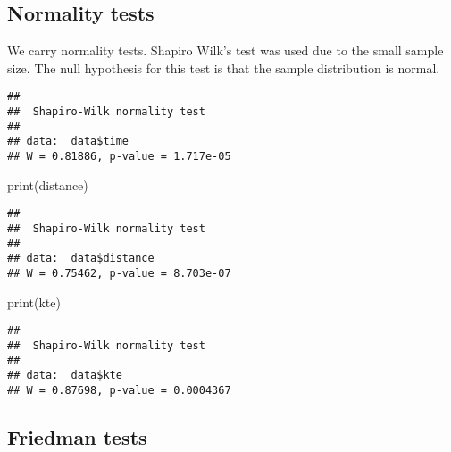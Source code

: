 \documentclass[
]{article}
\newenvironment{Shaded}{\begin{snugshade}}{\end{snugshade}}
\newcommand{\FunctionTok}[1]{\textcolor[rgb]{0.00,0.00,0.00}{#1}}
\newcommand{\NormalTok}[1]{#1}
\newcommand{\OtherTok}[1]{\textcolor[rgb]{0.56,0.35,0.01}{#1}}
\newcommand{\SpecialCharTok}[1]{\textcolor[rgb]{0.00,0.00,0.00}{#1}}
\begin{document}
\hypertarget{normality-tests}{%
\subsection{Normality tests}\label{normality-tests}}

We carry normality tests. Shapiro Wilk's test was used due to the small
sample size. The null hypothesis for this test is that the sample
distribution is normal.

\begin{Shaded}
\end{Shaded}

\begin{verbatim}
## 
##  Shapiro-Wilk normality test
## 
## data:  data$time
## W = 0.81886, p-value = 1.717e-05
\end{verbatim}

\begin{Shaded}
\begin{Highlighting}[]
\FunctionTok{print}\NormalTok{(distance)}
\end{Highlighting}
\end{Shaded}

\begin{verbatim}
## 
##  Shapiro-Wilk normality test
## 
## data:  data$distance
## W = 0.75462, p-value = 8.703e-07
\end{verbatim}

\begin{Shaded}
\begin{Highlighting}[]
\FunctionTok{print}\NormalTok{(kte)}
\end{Highlighting}
\end{Shaded}

\begin{verbatim}
## 
##  Shapiro-Wilk normality test
## 
## data:  data$kte
## W = 0.87698, p-value = 0.0004367
\end{verbatim}

\hypertarget{friedman-tests}{%
\subsection{Friedman tests}\label{friedman-tests}}
\end{document}
